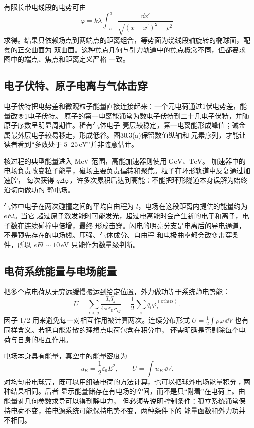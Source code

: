 有限长带电线段的电势可由
\[
  \varphi=k\lambda\int_{-a}^{a}
  \frac{\dd x'}{\sqrt{(x-x')^2+\rho^2}}
\]
求得。结果只依赖场点到两端点的距离组合，等势面为绕线段轴旋转的椭球面，配套的正交曲面为
双曲面。这种焦点几何与引力轨道中的焦点概念不同，但都要求图中的端点、焦点和距离定义严格
一致。

\subsection*{电子伏特、原子电离与气体击穿}

电子伏特把电势差和微观粒子能量直接连接起来：一个元电荷通过1伏电势差，能量改变1电子伏特。
原子的第一电离能通常为数电子伏特到二十几电子伏特，并随原子序数呈明显周期性。稀有气体电子
壳层较稳定，第一电离能形成峰值；碱金属最外层电子较易移走，形成低谷。图30.3(a)保留数值纵轴和
元素序列，才能让读者看到“多数处于 $5$--$25\,\mathrm{eV}$”并非随意估计。

核过程的典型能量进入 $\mathrm{MeV}$ 范围，高能加速器则使用 $\mathrm{GeV}$、$\mathrm{TeV}$。
加速器中的电场负责改变粒子能量，磁场主要负责偏转和聚焦。粒子在环形轨道中反复通过加速腔，
每次获得 $q\Delta\varphi$，许多次累积后达到高能；不能把环形隧道本身误解为始终沿切向做功的
静电场。

气体中电子在两次碰撞之间的平均自由程为 $l$，电场在这段距离内提供的能量约为 $eEl$。当它
超过原子激发能时可能发光，超过电离能时会产生新的电子和离子，电子数在连续碰撞中倍增，最终
形成击穿。闪电的明亮分支是电离后的导电通道，不是预先存在的电场线。压强、气体成分、自由程
和电极曲率都会改变击穿条件，所以 $eEl\sim10\,\mathrm{eV}$ 只能作为数量级判断。

\subsection*{电荷系统能量与电场能量}

把多个点电荷从无穷远缓慢搬运到给定位置，外力做功等于系统静电势能：
\[
  U=\sum_{i<j}\frac{q_iq_j}{4\pi\varepsilon_0r_{ij}}
   =\frac12\sum_i q_i\varphi_i^{(\mathrm{others})}.
\]
因子 $1/2$ 用来避免每一对相互作用被计算两次。连续分布形式
$U=\tfrac12\int\rho\varphi\,\dd V$ 也有同样含义。若把自能发散的理想点电荷包含在积分中，
还需明确是否剔除每个电荷与自身的相互作用。

电场本身具有能量，真空中的能量密度为
\[
  u_E=\frac12\varepsilon_0E^2,
  \qquad U=\int u_E\,\dd V.
\]
对均匀带电球壳，既可以用组装电荷的方法计算，也可以把球外电场能量积分；两种结果相同。后者
显示能量储存在有电场的空间，而不是只“附着”在电荷上。由能量对几何参数求导可以得到静电力，
但必须先说明控制条件：孤立系统通常保持电荷不变，接电源系统可能保持电势不变，两种条件下的
能量函数和外力功并不相同。

